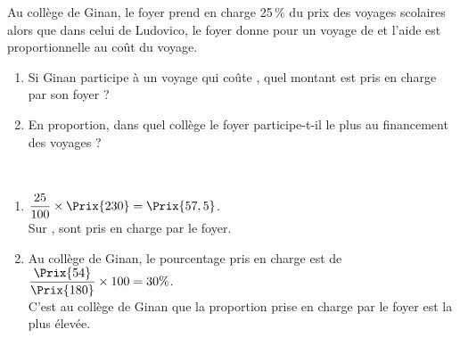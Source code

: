 \begin{exercice*} %
   Au collège de Ginan, le foyer prend en charge 25\,\% du prix des voyages scolaires alors que dans celui de Ludovico, le foyer donne  pour un voyage de  et l'aide est proportionnelle au coût du voyage.
   \begin{enumerate}
      \item Si Ginan participe à un voyage qui coûte , quel montant est pris en charge par son foyer ?
      \item En proportion, dans quel collège le foyer participe-t-il le plus au financement des voyages ?
   \end{enumerate}
\end{exercice*}

\begin{corrige}
   \ \\ [-5mm]
   \begin{enumerate}
      \item $\dfrac{25}{100}\times\Prix{230} =\Prix{57,5}$. \\ [2mm]
         Sur , {\red {} sont pris en charge par le foyer}.
      \item Au collège de Ginan, le pourcentage pris en charge est de $\dfrac{\Prix{54}}{\Prix{180}}\times100 =30\%$. \\ [2mm]
      C'est au {\red collège de Ginan que la proportion prise en charge par le foyer est la plus élevée}.
   \end{enumerate}
\end{corrige}
